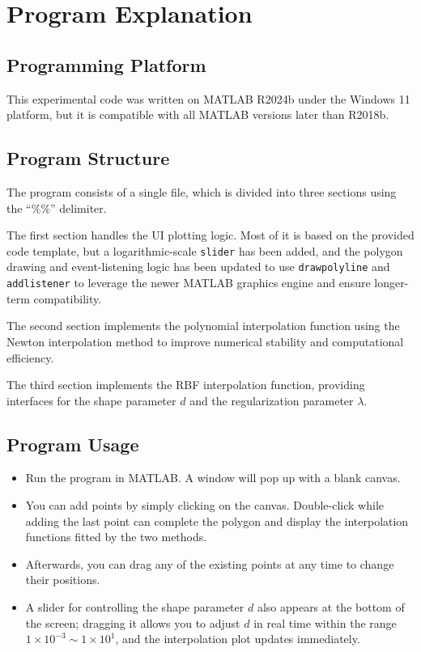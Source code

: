 \documentclass[12pt,a4paper]{report}
\begin{document}
    \chapter{Program Explanation}
        \section{Programming Platform}
            This experimental code was written on MATLAB R2024b under the Windows 11 platform, but it is compatible with all MATLAB versions later than R2018b.

        \section{Program Structure}
            The program consists of a single file, which is divided into three sections using the ``\%\%'' delimiter.

            The first section handles the UI plotting logic. Most of it is based on the provided code template, but a logarithmic-scale \texttt{slider} has been added, and the polygon drawing and event-listening logic has been updated to use \texttt{drawpolyline} and \texttt{addlistener} to leverage the newer MATLAB graphics engine and ensure longer-term compatibility.

            The second section implements the polynomial interpolation function using the Newton interpolation method to improve numerical stability and computational efficiency.

            The third section implements the RBF interpolation function, providing interfaces for the shape parameter $d$ and the regularization parameter $\lambda$.


        \section{Program Usage}
            \begin{itemize}
                \item Run the program in MATLAB. A window will pop up with a blank canvas.
                \item You can add points by simply clicking on the canvas. Double-click while adding the last point can complete the polygon and display the interpolation functions fitted by the two methods.
                \item Afterwards, you can drag any of the existing points at any time to change their positions.
                \item A slider for controlling the shape parameter $d$ also appears at the bottom of the screen; dragging it allows you to adjust $d$ in real time within the range $1\times10^{-3} \sim 1\times10^{1}$, and the interpolation plot updates immediately.
            \end{itemize} 
\end{document}
